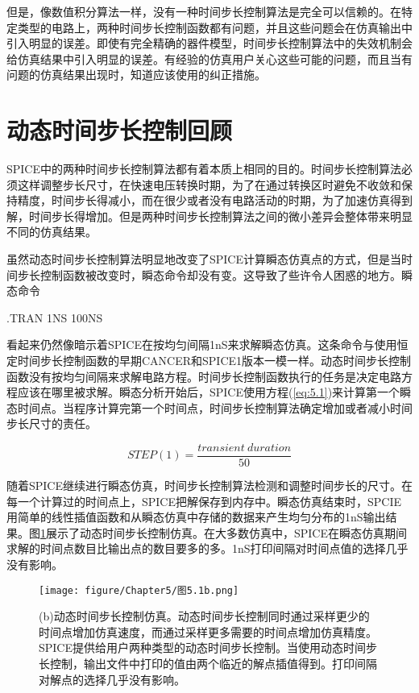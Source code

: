 但是，像数值积分算法一样，没有一种时间步长控制算法是完全可以信赖的。在特定类型的电路上，两种时间步长控制函数都有问题，并且这些问题会在仿真输出中引入明显的误差。即使有完全精确的器件模型，时间步长控制算法中的失效机制会给仿真结果中引入明显的误差。有经验的仿真用户关心这些可能的问题，而且当有问题的仿真结果出现时，知道应该使用的纠正措施。


\section{动态时间步长控制回顾}
SPICE中的两种时间步长控制算法都有着本质上相同的目的。时间步长控制算法必须这样调整步长尺寸，在快速电压转换时期，为了在通过转换区时避免不收敛和保持精度，时间步长得减小，而在很少或者没有电路活动的时期，为了加速仿真得到解，时间步长得增加。但是两种时间步长控制算法之间的微小差异会整体带来明显不同的仿真结果。

虽然动态时间步长控制算法明显地改变了SPICE计算瞬态仿真点的方式，但是当时间步长控制函数被改变时，瞬态命令却没有变。这导致了些许令人困惑的地方。瞬态命令

.TRAN 1NS 100NS

看起来仍然像暗示着SPICE在按均匀间隔1nS来求解瞬态仿真。这条命令与使用恒定时间步长控制函数的早期CANCER和SPICE1版本一模一样。动态时间步长控制函数没有按均匀间隔来求解电路方程。时间步长控制函数执行的任务是决定电路方程应该在哪里被求解。瞬态分析开始后，SPICE使用方程(\ref{eq:5.1})来计算第一个瞬态时间点。当程序计算完第一个时间点，时间步长控制算法确定增加或者减小时间步长尺寸的责任。

\begin{equation}
    STEP(1)=\frac{transient\ duration}{50}
    \label{eq:5.1}
\end{equation}

随着SPICE继续进行瞬态仿真，时间步长控制算法检测和调整时间步长的尺寸。在每一个计算过的时间点上，SPICE把解保存到内存中。瞬态仿真结束时，SPCIE用简单的线性插值函数和从瞬态仿真中存储的数据来产生均匀分布的1nS输出结果。图\ref{图5.1b}展示了动态时间步长控制仿真。在大多数仿真中，SPICE在瞬态仿真期间求解的时间点数目比输出点的数目要多的多。1nS打印间隔对时间点值的选择几乎没有影响。

\begin{figure}[htbp]
\small
    \centering
    \texttt{[image: figure/Chapter5/图5.1b.png]}
    \caption{(b)动态时间步长控制仿真。动态时间步长控制同时通过采样更少的时间点增加仿真速度，而通过采样更多需要的时间点增加仿真精度。SPICE提供给用户两种类型的动态时间步长控制。当使用动态时间步长控制，输出文件中打印的值由两个临近的解点插值得到。打印间隔对解点的选择几乎没有影响。}
    \label{图5.1b}
\end{figure}

